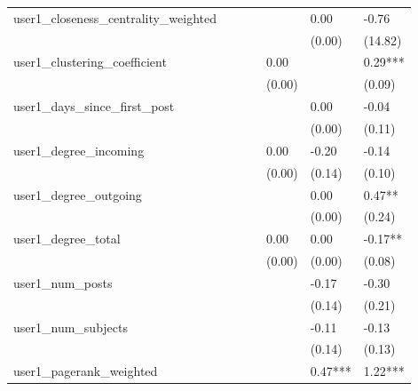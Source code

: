 \begin{table}
\begin{center}
\begin{tabular}{lllllll}
user1_closeness_centrality_weighted            &          &         &         &         & 0.00         & -0.76         \\
                                               &          &         &         &         & (0.00)       & (14.82)       \\
user1_clustering_coefficient                   &          &         &         & 0.00    &              & 0.29***       \\
                                               &          &         &         & (0.00)  &              & (0.09)        \\
user1_days_since_first_post                    &          &         &         &         & 0.00         & -0.04         \\
                                               &          &         &         &         & (0.00)       & (0.11)        \\
user1_degree_incoming                          &          &         &         & 0.00    & -0.20        & -0.14         \\
                                               &          &         &         & (0.00)  & (0.14)       & (0.10)        \\
user1_degree_outgoing                          &          &         &         &         & 0.00         & 0.47**        \\
                                               &          &         &         &         & (0.00)       & (0.24)        \\
user1_degree_total                             &          &         &         & 0.00    & 0.00         & -0.17**       \\
                                               &          &         &         & (0.00)  & (0.00)       & (0.08)        \\
user1_num_posts                                &          &         &         &         & -0.17        & -0.30         \\
                                               &          &         &         &         & (0.14)       & (0.21)        \\
user1_num_subjects                             &          &         &         &         & -0.11        & -0.13         \\
                                               &          &         &         &         & (0.14)       & (0.13)        \\
user1_pagerank_weighted                        &          &         &         &         & 0.47***      & 1.22***       \\

\end{tabular}
\end{center}
\end{table}
